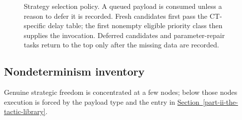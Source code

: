 \documentclass[
  11pt,
]{article}
\theoremstyle{definition}
\newcommand{\secref}[1]{\hyperref[#1]{Section~\ref*{#1}}}
\begin{document}
\begin{figure}[htbp]
{%
}
\caption[Strategy selection policy]{Strategy selection policy.  A queued payload is consumed unless a reason to defer it is recorded.  Fresh candidates first pass the CT-specific delay table; the first nonempty eligible priority class then supplies the invocation.  Deferred candidates and parameter-repair tasks return to the top only after the missing data are recorded.}
\label{fig:strategy-selection-policy}
\end{figure}

\subsection{Nondeterminism inventory}\label{nondeterminism-inventory}

Genuine strategic freedom is concentrated at a few nodes; below those
nodes execution is forced by the payload type and the entry in \secref{part-ii-the-tactic-library}.
\end{document}
